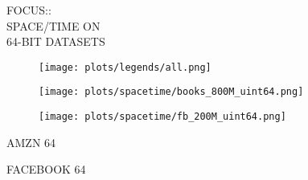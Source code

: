 \documentclass{article}
\begin{document}
\begin{figure}[!htbp]
\fbox
{
\begin{minipage}[t][0.98\textheight][t]{\textwidth}
\centering
    \begin{minipage}{0.23\linewidth}
    \footnotesize{FOCUS::\\ SPACE/TIME ON \\ 64-BIT DATASETS}
    \end{minipage}
   \begin{minipage}{0.75\linewidth}
        \begin{figure}[H]
        \texttt{[image: plots/legends/all.png]}
        \end{figure}
    \end{minipage}
    \vfill 

   \begin{minipage}{0.48\linewidth}
        \begin{figure}[H]
        \texttt{[image: plots/spacetime/books\_800M\_uint64.png]}
        \end{figure}
    \end{minipage}
    \begin{minipage}{0.48\linewidth}
        \begin{figure}[H]
        \texttt{[image: plots/spacetime/fb\_200M\_uint64.png]} 
        \end{figure}
    \end{minipage}
    \begin{minipage}{0.48\linewidth}
    \begin{center}
        AMZN 64
    \end{center}
    \end{minipage}
    \begin{minipage}{0.48\linewidth}
    \begin{center}
        FACEBOOK 64
    \end{center}
    \end{minipage}

    \vfill


\end{minipage}}
\end{figure}
\end{document}
